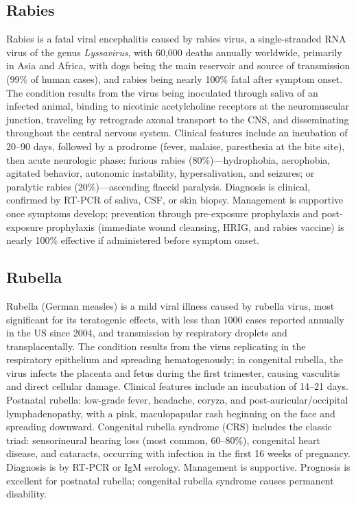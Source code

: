 \subsection{Rabies}
\label{sec:Rabies}
Rabies is a fatal viral encephalitis caused by rabies virus, a single-stranded RNA virus of the genus \textit{Lyssavirus}, with 60,000 deaths annually worldwide, primarily in Asia and Africa, with dogs being the main reservoir and source of transmission (99\% of human cases), and rabies being nearly 100\% fatal after symptom onset. The condition results from the virus being inoculated through saliva of an infected animal, binding to nicotinic acetylcholine receptors at the neuromuscular junction, traveling by retrograde axonal transport to the CNS, and disseminating throughout the central nervous system. Clinical features include an incubation of 20--90 days, followed by a prodrome (fever, malaise, paresthesia at the bite site), then acute neurologic phase: furious rabies (80\%)---hydrophobia, aerophobia, agitated behavior, autonomic instability, hypersalivation, and seizures; or paralytic rabies (20\%)---ascending flaccid paralysis. Diagnosis is clinical, confirmed by RT-PCR of saliva, CSF, or skin biopsy. Management is supportive once symptoms develop; prevention through pre-exposure prophylaxis and post-exposure prophylaxis (immediate wound cleansing, HRIG, and rabies vaccine) is nearly 100\% effective if administered before symptom onset.

\subsection{Rubella}
\label{sec:Rubella}
Rubella (German measles) is a mild viral illness caused by rubella virus, most significant for its teratogenic effects, with less than 1000 cases reported annually in the US since 2004, and transmission by respiratory droplets and transplacentally. The condition results from the virus replicating in the respiratory epithelium and spreading hematogenously; in congenital rubella, the virus infects the placenta and fetus during the first trimester, causing vasculitis and direct cellular damage. Clinical features include an incubation of 14--21 days. Postnatal rubella: low-grade fever, headache, coryza, and post-auricular/occipital lymphadenopathy, with a pink, maculopapular rash beginning on the face and spreading downward. Congenital rubella syndrome (CRS) includes the classic triad: sensorineural hearing loss (most common, 60--80\%), congenital heart disease, and cataracts, occurring with infection in the first 16 weeks of pregnancy. Diagnosis is by RT-PCR or IgM serology. Management is supportive. Prognosis is excellent for postnatal rubella; congenital rubella syndrome causes permanent disability.

